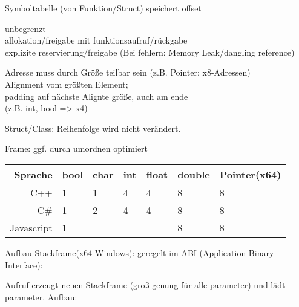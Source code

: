 Symboltabelle (von Funktion/Struct) speichert offset

 unbegrenzt\\
 allokation/freigabe mit funktionsaufruf/rückgabe\\
 explizite reservierung/freigabe (Bei fehlern: Memory Leak/dangling reference)


 Adresse muss durch Größe teilbar sein (z.B. Pointer: x8-Adressen)\\
 Alignment vom größten Element; \\padding auf nächste Alignte größe, auch am ende \\
(z.B. {int, bool} => x4) 

Struct/Class: Reihenfolge wird nicht verändert.

Frame: ggf. durch umordnen optimiert

\begin{tabular}{|r|l|l|l|l|l|l|}
\hline
Sprache & bool & char & int & float & double & Pointer(x64) \\ 
\hline
C++ & 1&1 & 4 &4&8&8\\
\hline
C\# & 1&2 & 4 &4&8&8\\
\hline
Javascript & 1 &&&&8&8\\
\hline
\end{tabular}


Aufbau Stackframe(x64 Windows): geregelt im ABI (Application Binary Interface):

Aufruf erzeugt neuen Stackframe (groß genung für alle parameter) und lädt parameter. Aufbau:

